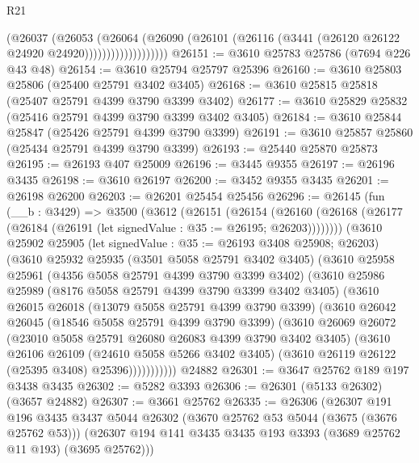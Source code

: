 \begin{lexlean}{R21}
\begin{coremodule}
                          (@26037
                            (@26053
                              (@26064
                                (@26090
                                  (@26101
                                    (@26116 (@3441 (@26120 @26122 @24920 @24920)))))))))))))))))))
@26151 := @3610 @25783 @25786 (@7694 @226 @43 @48)
@26154 := @3610 @25794 @25797 @25396
@26160 := @3610 @25803 @25806 (@25400 @25791 @3402 @3405)
@26168 := @3610 @25815 @25818 (@25407 @25791 @4399 @3790 @3399 @3402)
@26177 := @3610 @25829 @25832 (@25416 @25791 @4399 @3790 @3399 @3402 @3405)
@26184 := @3610 @25844 @25847 (@25426 @25791 @4399 @3790 @3399)
@26191 := @3610 @25857 @25860 (@25434 @25791 @4399 @3790 @3399)
@26193 := @25440 @25870 @25873
@26195 := @26193 @407 @25009
@26196 := @3445 @9355
@26197 := @26196 @3435
@26198 := @3610 @26197
@26200 := @3452 @9355 @3435
@26201 := @26198 @26200
@26203 := @26201 @25454 @25456
@26296 := @26145
    (fun (__b : @3429) =>
    @3500
      (@3612
        (@26151
          (@26154
            (@26160 (@26168 (@26177 (@26184 (@26191 (let signedValue : @35 := @26195; @26203))))))))
        (@3610
          @25902
          @25905
          (let signedValue : @35 := @26193 @3408 @25908; @26203)
          (@3610
            @25932
            @25935
            (@3501 @5058 @25791 @3402 @3405)
            (@3610
              @25958
              @25961
              (@4356 @5058 @25791 @4399 @3790 @3399 @3402)
              (@3610
                @25986
                @25989
                (@8176 @5058 @25791 @4399 @3790 @3399 @3402 @3405)
                (@3610
                  @26015
                  @26018
                  (@13079 @5058 @25791 @4399 @3790 @3399)
                  (@3610
                    @26042
                    @26045
                    (@18546 @5058 @25791 @4399 @3790 @3399)
                    (@3610
                      @26069
                      @26072
                      (@23010 @5058 @25791 @26080 @26083 @4399 @3790 @3402 @3405)
                      (@3610
                        @26106
                        @26109
                        (@24610 @5058 @5266 @3402 @3405)
                        (@3610 @26119 @26122 (@25395 @3408) @25396)))))))))))
    @24882
@26301 := @3647 @25762 @189 @197 @3438 @3435
@26302 := @5282 @3393
@26306 := @26301 (@5133 @26302) (@3657 @24882)
@26307 := @3661 @25762
@26335 := @26306
    (@26307
      @191
      @196
      @3435
      @3437
      @5044
      @26302
      (@3670 @25762 @53 @5044 (@3675 (@3676 @25762 @53)))
      (@26307 @194 @141 @3435 @3435 @193 @3393 (@3689 @25762 @11 @193) (@3695 @25762)))

\end{coremodule}
\end{lexlean}
